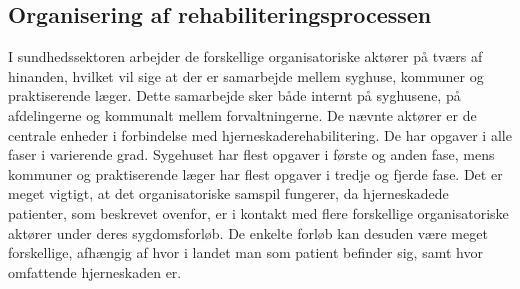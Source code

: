 \subsection{Organisering af rehabiliteringsprocessen}
I sundhedssektoren arbejder de forskellige organisatoriske aktører på tværs af hinanden, hvilket vil sige at der er samarbejde mellem syghuse, kommuner og praktiserende læger. Dette samarbejde sker både internt på syghusene, på afdelingerne og kommunalt mellem forvaltningerne. \cite{Sundhedsstyrelsen2010}
De nævnte aktører er de centrale enheder i forbindelse med hjerneskaderehabilitering. De har opgaver i alle faser i varierende grad. Sygehuset har flest opgaver i første og anden fase, mens kommuner og praktiserende læger har flest opgaver i tredje og fjerde fase. \cite{Sundhedsstyrelsen2011a}
Det er meget vigtigt, at det organisatoriske samspil fungerer, da hjerneskadede patienter, som beskrevet ovenfor, er i kontakt med flere forskellige organisatoriske aktører under deres sygdomsforløb. De enkelte forløb kan desuden være meget forskellige, afhængig af hvor i landet man som patient befinder sig, samt hvor omfattende hjerneskaden er.\cite{Sundhedsstyrelsen2010}








